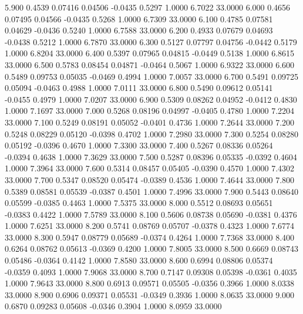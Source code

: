    5.900   0.4539   0.07416   0.04506  -0.0435   0.5297   1.0000   6.7022  33.0000
   6.000   0.4656   0.07495   0.04566  -0.0435   0.5268   1.0000   6.7309  33.0000
   6.100   0.4785   0.07581   0.04629  -0.0436   0.5240   1.0000   6.7588  33.0000
   6.200   0.4933   0.07679   0.04693  -0.0438   0.5212   1.0000   6.7870  33.0000
   6.300   0.5127   0.07797   0.04756  -0.0442   0.5179   1.0000   6.8204  33.0000
   6.400   0.5397   0.07965   0.04815  -0.0449   0.5138   1.0000   6.8615  33.0000
   6.500   0.5783   0.08454   0.04871  -0.0464   0.5067   1.0000   6.9322  33.0000
   6.600   0.5489   0.09753   0.05035  -0.0469   0.4994   1.0000   7.0057  33.0000
   6.700   0.5491   0.09725   0.05094  -0.0463   0.4988   1.0000   7.0111  33.0000
   6.800   0.5490   0.09612   0.05141  -0.0455   0.4979   1.0000   7.0207  33.0000
   6.900   0.5309   0.08262   0.04952  -0.0412   0.4830   1.0000   7.1697  33.0000
   7.000   0.5268   0.08196   0.04997  -0.0405   0.4780   1.0000   7.2204  33.0000
   7.100   0.5249   0.08191   0.05052  -0.0401   0.4736   1.0000   7.2644  33.0000
   7.200   0.5248   0.08229   0.05120  -0.0398   0.4702   1.0000   7.2980  33.0000
   7.300   0.5254   0.08280   0.05192  -0.0396   0.4670   1.0000   7.3300  33.0000
   7.400   0.5267   0.08336   0.05264  -0.0394   0.4638   1.0000   7.3629  33.0000
   7.500   0.5287   0.08396   0.05335  -0.0392   0.4604   1.0000   7.3964  33.0000
   7.600   0.5314   0.08457   0.05405  -0.0390   0.4570   1.0000   7.4302  33.0000
   7.700   0.5347   0.08520   0.05474  -0.0389   0.4536   1.0000   7.4644  33.0000
   7.800   0.5389   0.08581   0.05539  -0.0387   0.4501   1.0000   7.4996  33.0000
   7.900   0.5443   0.08640   0.05599  -0.0385   0.4463   1.0000   7.5375  33.0000
   8.000   0.5512   0.08693   0.05651  -0.0383   0.4422   1.0000   7.5789  33.0000
   8.100   0.5606   0.08738   0.05690  -0.0381   0.4376   1.0000   7.6251  33.0000
   8.200   0.5741   0.08769   0.05707  -0.0378   0.4323   1.0000   7.6774  33.0000
   8.300   0.5947   0.08779   0.05689  -0.0374   0.4264   1.0000   7.7368  33.0000
   8.400   0.6264   0.08762   0.05613  -0.0369   0.4200   1.0000   7.8005  33.0000
   8.500   0.6669   0.08743   0.05486  -0.0364   0.4142   1.0000   7.8580  33.0000
   8.600   0.6994   0.08806   0.05374  -0.0359   0.4093   1.0000   7.9068  33.0000
   8.700   0.7147   0.09308   0.05398  -0.0361   0.4035   1.0000   7.9643  33.0000
   8.800   0.6913   0.09571   0.05505  -0.0356   0.3966   1.0000   8.0338  33.0000
   8.900   0.6906   0.09371   0.05531  -0.0349   0.3936   1.0000   8.0635  33.0000
   9.000   0.6870   0.09283   0.05608  -0.0346   0.3904   1.0000   8.0959  33.0000
